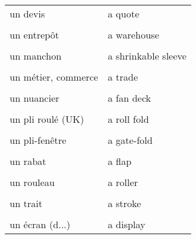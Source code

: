 \documentclass[
  10pt,
]{article}
\begin{document}
\begin{longtable}{ll}
un devis & a quote\\

\cellcolor{gray!6}{un dépliant} & \cellcolor{gray!6}{a folded leaflet}\\

un entrepôt & a warehouse\\

\cellcolor{gray!6}{un logiciel} & \cellcolor{gray!6}{a software}\\

un manchon & a shrinkable sleeve\\

\cellcolor{gray!6}{un massicot} & \cellcolor{gray!6}{a trimmer}\\

un métier, commerce & a trade\\

\cellcolor{gray!6}{un niveau} & \cellcolor{gray!6}{a level}\\

un nuancier & a fan deck\\

\cellcolor{gray!6}{un plateau} & \cellcolor{gray!6}{a tray}\\

un pli roulé (UK) & a roll fold\\

\cellcolor{gray!6}{un pli roulé (US)} & \cellcolor{gray!6}{a tri/letter fold}\\

un pli-fenêtre & a gate-fold\\

\cellcolor{gray!6}{un pli} & \cellcolor{gray!6}{a fold}\\

un rabat & a flap\\

\cellcolor{gray!6}{un revêtement} & \cellcolor{gray!6}{a coating}\\

un rouleau & a roller\\

\cellcolor{gray!6}{un stage} & \cellcolor{gray!6}{an internship}\\

un trait & a stroke\\

\cellcolor{gray!6}{un volume} & \cellcolor{gray!6}{a form}\\

un écran (d...) & a display\\


\end{longtable}
\end{document}
